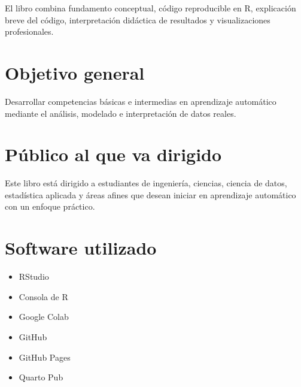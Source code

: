 \documentclass[
  spanish,
  10.5pt,
  letterpaper,
  openany,
  headings=big]{scrbook}
\providecommand{\tightlist}{%
  \setlength{\itemsep}{0pt}\setlength{\parskip}{0pt}}
\begin{document}
\begin{tcolorbox}[enhanced jigsaw, arc=.35mm, bottomrule=.15mm, bottomtitle=1mm, breakable, colback=white, colbacktitle=quarto-callout-note-color!10!white, colframe=quarto-callout-note-color-frame, coltitle=black, left=2mm, leftrule=.75mm, opacityback=0, opacitybacktitle=0.6, rightrule=.15mm, title=\textcolor{quarto-callout-note-color}{\faInfo}\hspace{0.5em}{Enfoque del libro}, titlerule=0mm, toprule=.15mm, toptitle=1mm]

El libro combina fundamento conceptual, código reproducible en R,
explicación breve del código, interpretación didáctica de resultados y
visualizaciones profesionales.

\end{tcolorbox}

\section*{Objetivo general}\label{objetivo-general}


Desarrollar competencias básicas e intermedias en aprendizaje automático
mediante el análisis, modelado e interpretación de datos reales.

\section*{Público al que va
dirigido}\label{puxfablico-al-que-va-dirigido}


Este libro está dirigido a estudiantes de ingeniería, ciencias, ciencia
de datos, estadística aplicada y áreas afines que desean iniciar en
aprendizaje automático con un enfoque práctico.

\section*{Software utilizado}\label{software-utilizado}


\begin{itemize}
\tightlist
\item
  RStudio
\item
  Consola de R
\item
  Google Colab
\item
  GitHub
\item
  GitHub Pages
\item
  Quarto Pub
\end{itemize}
\end{document}
